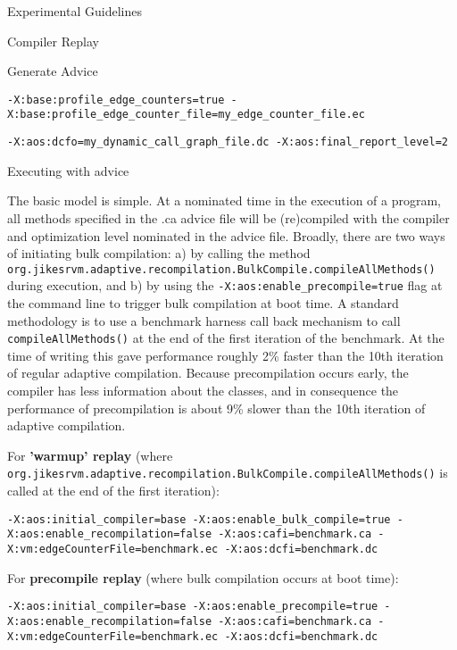 \begin{chapter}{Experimental Guidelines}
\begin{section}{Compiler Replay}
\begin{subsection}{Generate Advice}
\begin{lstlisting}[title=For edge count profile]
-X:base:profile_edge_counters=true -X:base:profile_edge_counter_file=my_edge_counter_file.ec
\end{lstlisting}

\begin{lstlisting}[title=For dynamic call graph profile]
-X:aos:dcfo=my_dynamic_call_graph_file.dc -X:aos:final_report_level=2 
\end{lstlisting}

\end{subsection}

\begin{subsection}{Executing with advice}

The basic model is simple.  At a nominated time in the execution of a program, all methods specified in the .ca advice file will be (re)compiled with the compiler and optimization level nominated in the advice file.  Broadly, there are two ways of initiating bulk compilation: a) by calling the method \texttt{org.jikes\-rvm.adaptive.re\-com\-pi\-la\-tion.Bulk\-Compile.compile\-All\-Methods()} during execution, and b) by using the \texttt{-X:aos:enable\_precompile=true} flag at the command line to trigger bulk compilation at boot time.  A standard methodology is to use a benchmark harness call back mechanism to call \texttt{compileAllMethods()} at the end of the first iteration of the benchmark.   At the time of writing this gave performance roughly 2\% faster than the 10th iteration of regular adaptive compilation.  Because precompilation occurs early, the compiler has less information about the classes, and in consequence the performance of precompilation is about 9\% slower than the 10th iteration of adaptive compilation.

For \textbf{'warmup' replay} (where \texttt{org.jikes\-rvm.adaptive.re\-com\-pi\-la\-tion.Bulk\-Compile.compile\-All\-Methods()} is called at the end of the first iteration):

\begin{lstlisting}
-X:aos:initial_compiler=base -X:aos:enable_bulk_compile=true -X:aos:enable_recompilation=false -X:aos:cafi=benchmark.ca -X:vm:edgeCounterFile=benchmark.ec -X:aos:dcfi=benchmark.dc
\end{lstlisting}

For \textbf{precompile replay} (where bulk compilation occurs at boot time):

\begin{lstlisting}
-X:aos:initial_compiler=base -X:aos:enable_precompile=true -X:aos:enable_recompilation=false -X:aos:cafi=benchmark.ca -X:vm:edgeCounterFile=benchmark.ec -X:aos:dcfi=benchmark.dc
\end{lstlisting}


\end{subsection}
\end{section}
\end{chapter}
